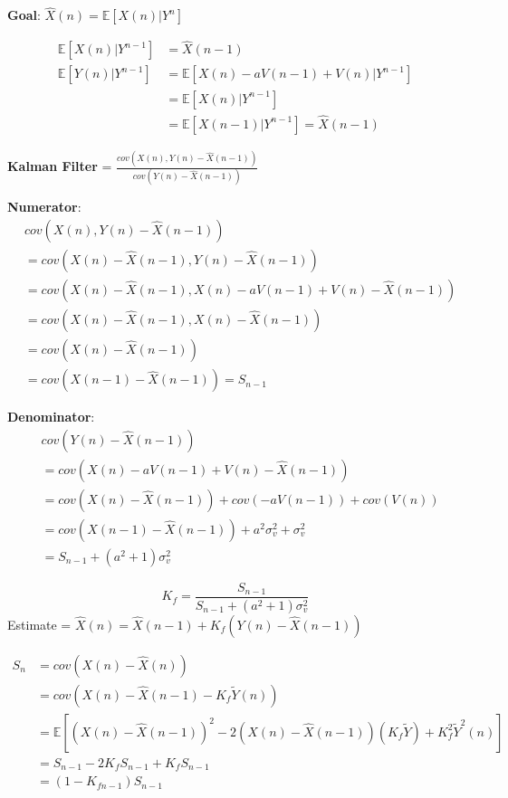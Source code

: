 \documentclass[leqno,twocolumn]{article}
\begin{document}
\textbf{Goal}: $\hat{X}(n) = \mathbb{E}[X(n)|Y^n] $

\begin{align}
\mathbb{E}[X(n)|Y^{n-1}] &= \hat{X}(n-1)\\
\mathbb{E}[Y(n)|Y^{n-1}] &= \mathbb{E}[X(n) - aV(n-1) + V(n) | Y^{n-1}]\\
&= \mathbb{E}[X(n) | Y^{n-1} ]\\
&= \mathbb{E}[X(n-1) | Y^{n-1} ] = \hat{X}(n-1)
\end{align}

\textbf{Kalman Filter} = $\frac{cov(X(n), Y(n) - \hat{X}(n-1))}{cov(Y(n) - \hat{X}(n-1))}$

\textbf{Numerator}:
\begin{align}
&cov(X(n), Y(n) - \hat{X}(n-1))\\
&= cov(X(n) - \hat{X}(n-1), Y(n) - \hat{X}(n-1))\\
&= cov(X(n) - \hat{X}(n-1), X(n) - aV(n-1) + V(n) - \hat{X}(n-1))\\
&= cov(X(n) - \hat{X}(n-1), X(n) - \hat{X}(n-1))\\
&= cov(X(n) - \hat{X}(n-1))\\
&= cov(X(n-1) - \hat{X}(n-1)) = S_{n-1}
\end{align}

\textbf{Denominator}:
\begin{align}
&cov(Y(n) - \hat{X}(n-1))\\
&= cov(X(n) -aV(n-1) + V(n) - \hat{X}(n-1))\\
&= cov(X(n) - \hat{X}(n-1)) + cov(-aV(n-1)) + cov(V(n))\\
&= cov(X(n-1) - \hat{X}(n-1)) + a^2\sigma_v^2 + \sigma_v^2\\
&= S_{n-1} + (a^2 + 1)\sigma_v^2
\end{align}

\[ K_f = \boxed{\frac{S_{n-1}}{S_{n-1} + (a^2+1)\sigma_v^2}} \]
Estimate = $\boxed{\hat{X}(n) = \hat{X}(n-1) + K_f(Y(n) - \hat{X}(n-1))} $

\begin{align}
S_n &= cov(X(n) - \hat{X}(n))\\
&= cov(X(n) - \hat{X}(n-1) - K_f\tilde{Y}(n))\\
&= \mathbb{E}[(X(n) - \hat{X}(n-1))^2 - 2(X(n)-\hat{X}(n-1))(K_f\tilde{Y}) + K_f^2\tilde{Y}^2(n)]\\
&= S_{n-1} - 2K_fS_{n-1} + K_fS_{n-1} \\
&= (1-K_{fn-1})S_{n-1}
\end{align}
\end{document}
